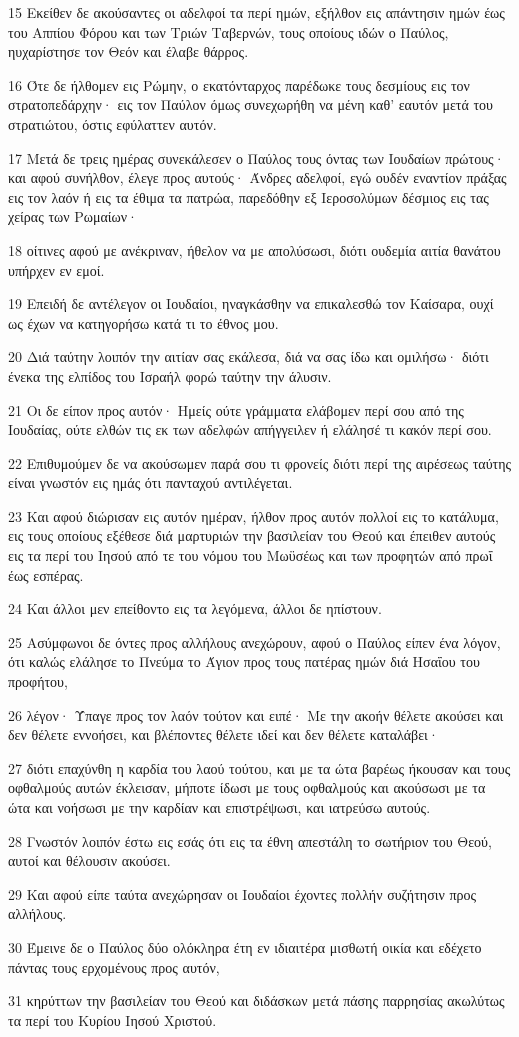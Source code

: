 \par 15 Εκείθεν δε ακούσαντες οι αδελφοί τα περί ημών, εξήλθον εις απάντησιν ημών έως του Αππίου Φόρου και των Τριών Ταβερνών, τους οποίους ιδών ο Παύλος, ηυχαρίστησε τον Θεόν και έλαβε θάρρος.
\par 16 Ότε δε ήλθομεν εις Ρώμην, ο εκατόνταρχος παρέδωκε τους δεσμίους εις τον στρατοπεδάρχην· εις τον Παύλον όμως συνεχωρήθη να μένη καθ' εαυτόν μετά του στρατιώτου, όστις εφύλαττεν αυτόν.
\par 17 Μετά δε τρεις ημέρας συνεκάλεσεν ο Παύλος τους όντας των Ιουδαίων πρώτους· και αφού συνήλθον, έλεγε προς αυτούς· Άνδρες αδελφοί, εγώ ουδέν εναντίον πράξας εις τον λαόν ή εις τα έθιμα τα πατρώα, παρεδόθην εξ Ιεροσολύμων δέσμιος εις τας χείρας των Ρωμαίων·
\par 18 οίτινες αφού με ανέκριναν, ήθελον να με απολύσωσι, διότι ουδεμία αιτία θανάτου υπήρχεν εν εμοί.
\par 19 Επειδή δε αντέλεγον οι Ιουδαίοι, ηναγκάσθην να επικαλεσθώ τον Καίσαρα, ουχί ως έχων να κατηγορήσω κατά τι το έθνος μου.
\par 20 Διά ταύτην λοιπόν την αιτίαν σας εκάλεσα, διά να σας ίδω και ομιλήσω· διότι ένεκα της ελπίδος του Ισραήλ φορώ ταύτην την άλυσιν.
\par 21 Οι δε είπον προς αυτόν· Ημείς ούτε γράμματα ελάβομεν περί σου από της Ιουδαίας, ούτε ελθών τις εκ των αδελφών απήγγειλεν ή ελάλησέ τι κακόν περί σου.
\par 22 Επιθυμούμεν δε να ακούσωμεν παρά σου τι φρονείς διότι περί της αιρέσεως ταύτης είναι γνωστόν εις ημάς ότι πανταχού αντιλέγεται.
\par 23 Και αφού διώρισαν εις αυτόν ημέραν, ήλθον προς αυτόν πολλοί εις το κατάλυμα, εις τους οποίους εξέθεσε διά μαρτυριών την βασιλείαν του Θεού και έπειθεν αυτούς εις τα περί του Ιησού από τε του νόμου του Μωϋσέως και των προφητών από πρωΐ έως εσπέρας.
\par 24 Και άλλοι μεν επείθοντο εις τα λεγόμενα, άλλοι δε ηπίστουν.
\par 25 Ασύμφωνοι δε όντες προς αλλήλους ανεχώρουν, αφού ο Παύλος είπεν ένα λόγον, ότι καλώς ελάλησε το Πνεύμα το Άγιον προς τους πατέρας ημών διά Ησαΐου του προφήτου,
\par 26 λέγον· Ύπαγε προς τον λαόν τούτον και ειπέ· Με την ακοήν θέλετε ακούσει και δεν θέλετε εννοήσει, και βλέποντες θέλετε ιδεί και δεν θέλετε καταλάβει·
\par 27 διότι επαχύνθη η καρδία του λαού τούτου, και με τα ώτα βαρέως ήκουσαν και τους οφθαλμούς αυτών έκλεισαν, μήποτε ίδωσι με τους οφθαλμούς και ακούσωσι με τα ώτα και νοήσωσι με την καρδίαν και επιστρέψωσι, και ιατρεύσω αυτούς.
\par 28 Γνωστόν λοιπόν έστω εις εσάς ότι εις τα έθνη απεστάλη το σωτήριον του Θεού, αυτοί και θέλουσιν ακούσει.
\par 29 Και αφού είπε ταύτα ανεχώρησαν οι Ιουδαίοι έχοντες πολλήν συζήτησιν προς αλλήλους.
\par 30 Έμεινε δε ο Παύλος δύο ολόκληρα έτη εν ιδιαιτέρα μισθωτή οικία και εδέχετο πάντας τους ερχομένους προς αυτόν,
\par 31 κηρύττων την βασιλείαν του Θεού και διδάσκων μετά πάσης παρρησίας ακωλύτως τα περί του Κυρίου Ιησού Χριστού.


